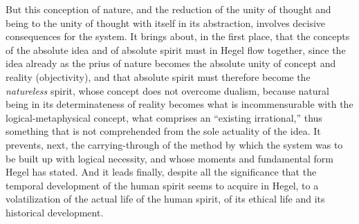 But this conception of nature, and the reduction of the unity of
thought and being to the unity of thought with itself in its
abstraction, involves decisive consequences for the system. It brings
about, in the first place, that the concepts of the absolute idea and
of absolute spirit must in Hegel flow together, since the idea already
as the prius of nature becomes the absolute unity of concept and
reality (objectivity), and that absolute spirit must therefore become
the \emph{natureless} spirit, whose concept does not overcome dualism,
because natural being in its determinateness of reality becomes what is
incommensurable with the logical-metaphysical concept, what
comprises an ``existing irrational,'' thus something that is not
comprehended from the sole actuality of the idea. It prevents, next,
the carrying-through of the method by which the system was to be built
up with logical necessity, and whose moments and fundamental form Hegel
has stated. And it leads finally, despite all the significance that the
temporal development of the human spirit seems to acquire in Hegel, to
a volatilization of the actual life of the human spirit, of its ethical
life and its historical development.

